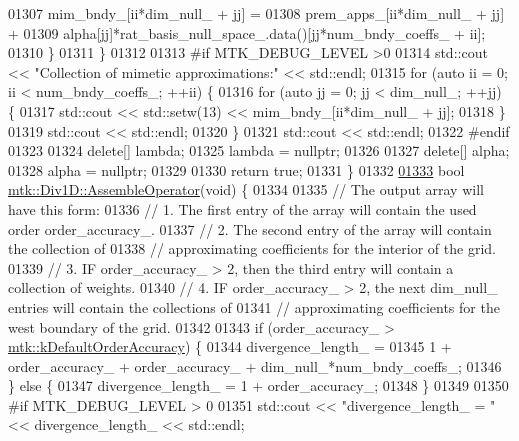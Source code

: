 \begin{DoxyCode}
{{01307       mim\_bndy\_[ii*dim\_null\_ + jj] =
01308         prem\_apps\_[ii*dim\_null\_ + jj] +
01309         alpha[jj]*rat\_basis\_null\_space\_.data()[jj*num\_bndy\_coeffs\_ + ii];
01310     \}
01311   \}
01312 
01313 \textcolor{preprocessor}{  #if MTK\_DEBUG\_LEVEL >0}
01314   std::cout << \textcolor{stringliteral}{"Collection of mimetic approximations:"} << std::endl;
01315   \textcolor{keywordflow}{for} (\textcolor{keyword}{auto} ii = 0; ii < num\_bndy\_coeffs\_; ++ii) \{
01316     \textcolor{keywordflow}{for} (\textcolor{keyword}{auto} jj = 0; jj < dim\_null\_; ++jj) \{
01317       std::cout << std::setw(13) << mim\_bndy\_[ii*dim\_null\_ + jj];
01318     \}
01319     std::cout << std::endl;
01320   \}
01321   std::cout << std::endl;
01322 \textcolor{preprocessor}{  #endif}
01323 
01324   \textcolor{keyword}{delete}[] lambda;
01325   lambda = \textcolor{keyword}{nullptr};
01326 
01327   \textcolor{keyword}{delete}[] alpha;
01328   alpha = \textcolor{keyword}{nullptr};
01329 
01330   \textcolor{keywordflow}{return} \textcolor{keyword}{true};
01331 \}
01332 
\hypertarget{mtk__div__1d_8cc_source_l01333}{}\hyperlink{classmtk_1_1Div1D_a5a12482e1ceac232339dd8f647af886b}{01333} \textcolor{keywordtype}{bool} \hyperlink{classmtk_1_1Div1D_a5a12482e1ceac232339dd8f647af886b}{mtk::Div1D::AssembleOperator}(\textcolor{keywordtype}{void}) \{
01334 
01335   \textcolor{comment}{// The output array will have this form:}
01336   \textcolor{comment}{// 1. The first entry of the array will contain the used order order\_accuracy\_.}
01337   \textcolor{comment}{// 2. The second entry of the array will contain the collection of}
01338   \textcolor{comment}{// approximating coefficients for the interior of the grid.}
01339   \textcolor{comment}{// 3. IF order\_accuracy\_ > 2, then the third entry will contain a collection of weights.}
01340   \textcolor{comment}{// 4. IF order\_accuracy\_ > 2, the next dim\_null\_ entries will contain the collections of}
01341   \textcolor{comment}{// approximating coefficients for the west boundary of the grid.}
01342 
01343   \textcolor{keywordflow}{if} (order\_accuracy\_ > \hyperlink{group__c01-roots_ga0d95560098eb36420511103637b6952f}{mtk::kDefaultOrderAccuracy}) \{
01344     divergence\_length\_ =
01345       1 + order\_accuracy\_ + order\_accuracy\_ + dim\_null\_*num\_bndy\_coeffs\_;
01346   \} \textcolor{keywordflow}{else} \{
01347     divergence\_length\_ = 1 + order\_accuracy\_;
01348   \}
01349 
01350 \textcolor{preprocessor}{  #if MTK\_DEBUG\_LEVEL > 0}
01351   std::cout << \textcolor{stringliteral}{"divergence\_length\_ = "} << divergence\_length\_ << std::endl;
}}
\end{DoxyCode}
